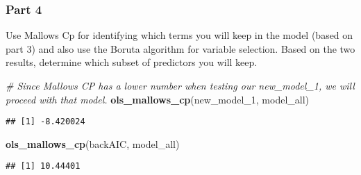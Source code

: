 \documentclass[
]{article}
\newenvironment{Shaded}{\begin{snugshade}}{\end{snugshade}}
\newcommand{\CommentTok}[1]{\textcolor[rgb]{0.56,0.35,0.01}{\textit{#1}}}
\newcommand{\DecValTok}[1]{\textcolor[rgb]{0.00,0.00,0.81}{#1}}
\newcommand{\KeywordTok}[1]{\textcolor[rgb]{0.13,0.29,0.53}{\textbf{#1}}}
\newcommand{\NormalTok}[1]{#1}
\begin{document}
\hypertarget{part-4}{%
\subsubsection{Part 4}\label{part-4}}

Use Mallows Cp for identifying which terms you will keep in the model
(based on part 3) and also use the Boruta algorithm for variable
selection. Based on the two results, determine which subset of
predictors you will keep.

\begin{Shaded}
\begin{Highlighting}[]
\CommentTok{# Since Mallows CP has a lower number when testing our new_model_1, we will proceed with that model. }
\KeywordTok{ols_mallows_cp}\NormalTok{(new_model_}\DecValTok{1}\NormalTok{, model_all)}
\end{Highlighting}
\end{Shaded}

\begin{verbatim}
## [1] -8.420024
\end{verbatim}

\begin{Shaded}
\begin{Highlighting}[]
\KeywordTok{ols_mallows_cp}\NormalTok{(backAIC, model_all)}
\end{Highlighting}
\end{Shaded}

\begin{verbatim}
## [1] 10.44401
\end{verbatim}
\end{document}
